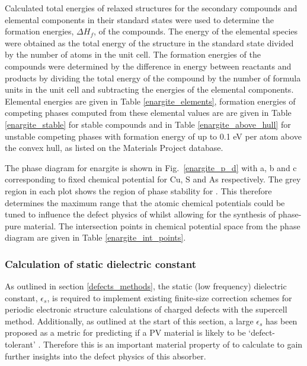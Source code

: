 \documentclass[11pt, twoside]{report}
\begin{document}
Calculated total energies of relaxed structures for the secondary compounds and elemental components in their standard states were used to determine the formation energies, $\Delta H_f$, of the compounds.
The energy of the elemental species were obtained as the total energy of the structure in the standard state divided by the number of atoms in the unit cell. The formation energies of the compounds were determined by the difference in energy between reactants and products by dividing the total energy of the compound by the number of formula units in the unit cell and subtracting the energies of the elemental components.
Elemental energies are given in Table \ref{enargite_elements}, formation energies of competing phases computed from these elemental values are are given in Table \ref{enargite_stable} for stable compounds and in Table \ref{enargite_above_hull} for unstable competing phases with formation energy of up to 0.1 eV per atom above the convex hull, as listed on the Materials Project database.

The phase diagram for enargite is shown in Fig.~\ref{enargite_p_d} with a, b and c corresponding to fixed chemical potential for Cu, S and As respectively. The grey region in each plot shows the region of phase stability for {\enargite}. This therefore determines the maximum range that the atomic chemical potentials could be tuned to influence the defect physics of {\enargite} whilst allowing for the synthesis of phase-pure material. The intersection points in chemical potential space from the {\enargite} phase diagram are given in Table \ref{enargite_int_points}.



\subsubsection{Calculation of static dielectric constant}

As outlined in section \ref{defects_methods}, the static (low frequency) dielectric constant, $\epsilon_s$, is required to implement existing finite-size correction schemes for periodic electronic structure calculations of charged defects with the supercell method. Additionally, as outlined at the start of this section, a large $\epsilon_s$ has been proposed as a metric for predicting if a PV material is likely to be `defect-tolerant' \cite{MIT_defect_tolerance}. Therefore this is an important material property of {\enargite} to calculate to gain further insights into the defect physics of this absorber.
\end{document}
